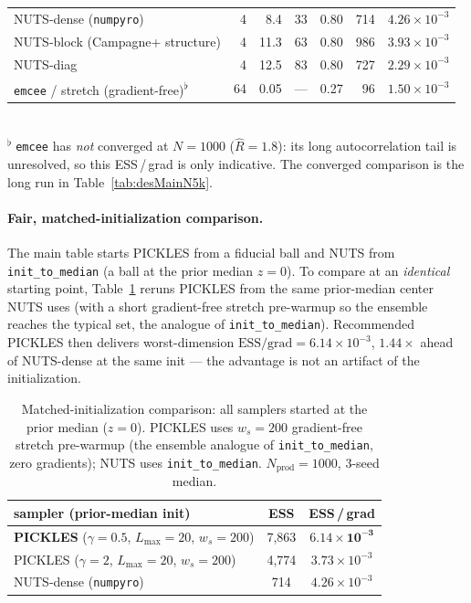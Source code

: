 \documentclass{article}
\begin{document}
\begin{table}[t]
\begin{tabular}{l rrrr rr}
NUTS-dense (\texttt{numpyro}) & 4 & 8.4 & 33 & 0.80 & 714 & $4.26\!\times\!10^{-3}$ \\
NUTS-block (Campagne+ structure) & 4 & 11.3 & 63 & 0.80 & 986 & $3.93\!\times\!10^{-3}$ \\
NUTS-diag & 4 & 12.5 & 83 & 0.80 & 727 & $2.29\!\times\!10^{-3}$ \\
\texttt{emcee} / stretch (gradient-free)\textsuperscript{$\flat$} & 64 & 0.05 & --- & 0.27 & 96 & $1.50\!\times\!10^{-3}$ \\
\bottomrule
\end{tabular}
\\[2pt]
{\footnotesize \textsuperscript{$\flat$} \texttt{emcee} has \emph{not}
converged at $N{=}1000$ ($\hat R=1.8$): its long autocorrelation tail is
unresolved, so this ESS\,/\,grad is only indicative. The converged
comparison is the long run in Table~\ref{tab:desMainN5k}.}
\end{table}

\paragraph{Fair, matched-initialization comparison.}
The main table starts PICKLES from a fiducial ball and NUTS from
\texttt{init\_to\_median} (a ball at the prior median $z=0$). To compare
at an \emph{identical} starting point, Table~\ref{tab:desFairInit} reruns
PICKLES from the same prior-median center NUTS uses (with a short
gradient-free stretch pre-warmup so the ensemble reaches the typical
set, the analogue of \texttt{init\_to\_median}). Recommended PICKLES
then delivers worst-dimension $\text{ESS}/\text{grad}=6.14\times10^{-3}$,
$1.44\times$ ahead of NUTS-dense at the same init --- the advantage is
not an artifact of the initialization.

\begin{table}[h]
\centering
\caption{Matched-initialization comparison: all samplers started at the
prior median ($z=0$). PICKLES uses $w_s=200$ gradient-free stretch
pre-warmup (the ensemble analogue of \texttt{init\_to\_median}, zero
gradients); NUTS uses \texttt{init\_to\_median}. $N_{\text{prod}}=1000$,
$3$-seed median.}
\label{tab:desFairInit}
\small
\begin{tabular}{l c c}
\toprule
sampler (prior-median init) & ESS & ESS\,/\,grad \\
\midrule
\textbf{PICKLES} ($\gamma=0.5$, $L_{\max}=20$, $w_s=200$)
   & 7{,}863 & $\mathbf{6.14\!\times\!10^{-3}}$ \\
PICKLES ($\gamma=2$, $L_{\max}=20$, $w_s=200$)
   & 4{,}774 & $3.73\!\times\!10^{-3}$ \\
NUTS-dense (\texttt{numpyro}) & 714 & $4.26\!\times\!10^{-3}$ \\
\bottomrule
\end{tabular}
\end{table}
\end{document}

